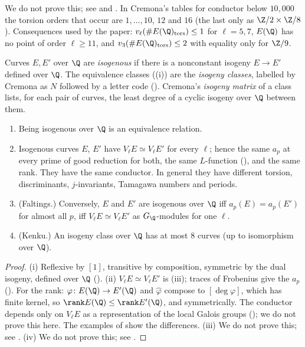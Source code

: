 \noindent We do not prove this; see \cite{Mazur77} and \cite[Section VIII.7]{SilvermanAEC}. In Cremona's tables for conductor below $10{,}000$ the torsion orders that occur are
$1,\dots,10$, $12$ and $16$ (the last only as $\Z/2\times\Z/8$). Consequences used by the paper: $v_\ell(\#E(\Q)_{\mathrm{tors}})\le1$ for $\ell=5,7$, $E(\Q)$ has no point of order $\ell\ge11$, and
$v_3(\#E(\Q)_{\mathrm{tors}})\le2$ with equality only for $\Z/9$.

\begin{definition}\label{def:ellcurves:isogclass}
Curves $E,E'$ over $\Q$ are \emph{isogenous} if there is a nonconstant isogeny $E\to E'$ defined over $\Q$. The equivalence classes ((i)) are the
\emph{isogeny classes}, labelled by Cremona as $N$ followed by a letter code (). Cremona's \emph{isogeny matrix} of a class lists, for each pair of curves, the
least degree of a cyclic isogeny over $\Q$ between them.
\end{definition}

\begin{theorem}\label{thm:ellcurves:isogclass}
\leavevmode
\begin{enumerate}[label=(\roman*)]
\item Being isogenous over $\Q$ is an equivalence relation.
\item Isogenous curves $E$, $E'$ have $V_\ell E\simeq V_\ell E'$ for every $\ell$; hence the same $a_p$ at every prime of good reduction for both, the same $L$-function
(), and the same rank. They have the same conductor. In general they have different torsion, discriminants, $j$-invariants, Tamagawa numbers and periods.
\item (Faltings.) Conversely, $E$ and $E'$ are isogenous over $\Q$ iff $a_p(E)=a_p(E')$ for almost all $p$, iff $V_\ell E\simeq V_\ell E'$ as $G_\Q$-modules for one $\ell$.
\item (Kenku.) An isogeny class over $\Q$ has at most $8$ curves (up to isomorphism over $\Q$).
\end{enumerate}
\end{theorem}

\begin{proof}
(i) Reflexive by $[1]$, transitive by composition, symmetric by the dual isogeny, defined over $\Q$ (). (ii) $V_\ell E\simeq V_\ell E'$ is
(iii); traces of Frobenius give the $a_p$ (). For the rank: $\varphi\colon E(\Q)\to E'(\Q)$ and $\hat\varphi$ compose to $[\deg\varphi]$, which has finite
kernel, so $\rank E(\Q)\le\rank E'(\Q)$, and symmetrically. The conductor depends only on $V_\ell E$ as a representation of the local Galois groups (); we do not
prove this here. The examples of  show the differences. (iii) We do not prove this; see \cite{Faltings83}. (iv) We do not prove this; see \cite[Theorem 2]{Kenku}.
\end{proof}

